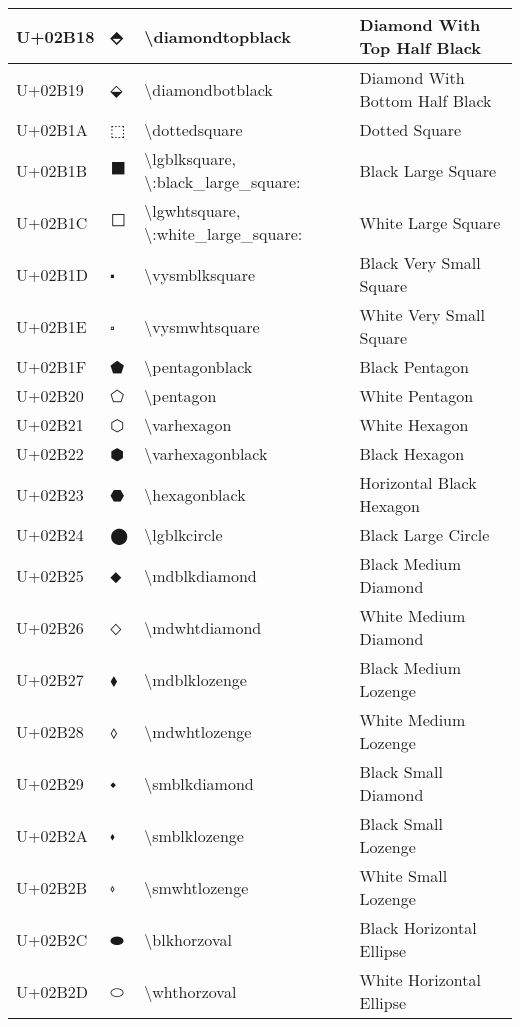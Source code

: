\begin{table}[h]
\begin{tabulary}{\linewidth}{|L|L|L|L|}
\hline
U+02B18 & ⬘ & {\textbackslash}diamondtopblack & Diamond With Top Half Black \\
\hline
U+02B19 & ⬙ & {\textbackslash}diamondbotblack & Diamond With Bottom Half Black \\
\hline
U+02B1A & ⬚ & {\textbackslash}dottedsquare & Dotted Square \\
\hline
U+02B1B & ⬛ & {\textbackslash}lgblksquare, {\textbackslash}:black\_large\_square: & Black Large Square \\
\hline
U+02B1C & ⬜ & {\textbackslash}lgwhtsquare, {\textbackslash}:white\_large\_square: & White Large Square \\
\hline
U+02B1D & ⬝ & {\textbackslash}vysmblksquare & Black Very Small Square \\
\hline
U+02B1E & ⬞ & {\textbackslash}vysmwhtsquare & White Very Small Square \\
\hline
U+02B1F & ⬟ & {\textbackslash}pentagonblack & Black Pentagon \\
\hline
U+02B20 & ⬠ & {\textbackslash}pentagon & White Pentagon \\
\hline
U+02B21 & ⬡ & {\textbackslash}varhexagon & White Hexagon \\
\hline
U+02B22 & ⬢ & {\textbackslash}varhexagonblack & Black Hexagon \\
\hline
U+02B23 & ⬣ & {\textbackslash}hexagonblack & Horizontal Black Hexagon \\
\hline
U+02B24 & ⬤ & {\textbackslash}lgblkcircle & Black Large Circle \\
\hline
U+02B25 & ⬥ & {\textbackslash}mdblkdiamond & Black Medium Diamond \\
\hline
U+02B26 & ⬦ & {\textbackslash}mdwhtdiamond & White Medium Diamond \\
\hline
U+02B27 & ⬧ & {\textbackslash}mdblklozenge & Black Medium Lozenge \\
\hline
U+02B28 & ⬨ & {\textbackslash}mdwhtlozenge & White Medium Lozenge \\
\hline
U+02B29 & ⬩ & {\textbackslash}smblkdiamond & Black Small Diamond \\
\hline
U+02B2A & ⬪ & {\textbackslash}smblklozenge & Black Small Lozenge \\
\hline
U+02B2B & ⬫ & {\textbackslash}smwhtlozenge & White Small Lozenge \\
\hline
U+02B2C & ⬬ & {\textbackslash}blkhorzoval & Black Horizontal Ellipse \\
\hline
U+02B2D & ⬭ & {\textbackslash}whthorzoval & White Horizontal Ellipse \\

\end{tabulary}
\end{table}
